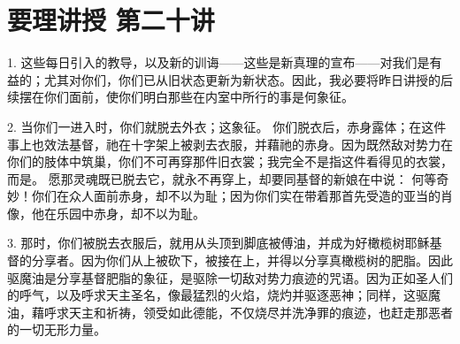 

\section{要理讲授 第二十讲}

\par

\par

\par

\par

1. 这些每日引入的教导，以及新的训诲——这些是新真理的宣布——对我们是有益的；尤其对你们，你们已从旧状态更新为新状态。因此，我必要将昨日讲授的后续摆在你们面前，使你们明白那些在内室中所行的事是何象征。\par

2. 当你们一进入时，你们就脱去外衣；这象征。 你们脱衣后，赤身露体；在这件事上也效法基督，祂在十字架上被剥去衣服，并藉祂的赤身。因为既然敌对势力在你们的肢体中筑巢，你们不可再穿那件旧衣裳；我完全不是指这件看得见的衣裳，而是。 愿那灵魂既已脱去它，就永不再穿上，却要同基督的新娘在中说： 何等奇妙！你们在众人面前赤身，却不以为耻；因为你们实在带着那首先受造的亚当的肖像，他在乐园中赤身，却不以为耻。\par

3. 那时，你们被脱去衣服后，就用从头顶到脚底被傅油，并成为好橄榄树耶稣基督的分享者。因为你们从上被砍下，被接在上，并得以分享真橄榄树的肥脂。因此驱魔油是分享基督肥脂的象征，是驱除一切敌对势力痕迹的咒语。因为正如圣人们的呼气，以及呼求天主圣名，像最猛烈的火焰，烧灼并驱逐恶神；同样，这驱魔油，藉呼求天主和祈祷，领受如此德能，不仅烧尽并洗净罪的痕迹，也赶走那恶者的一切无形力量。\par

